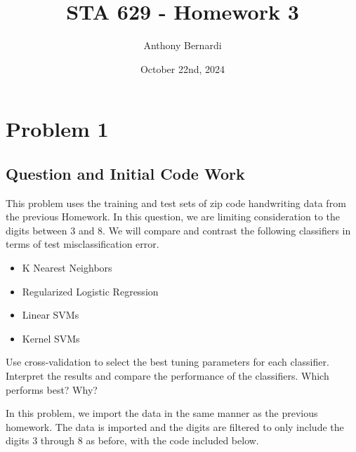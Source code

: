 \documentclass[12pt, letterpaper]{article}
\title{STA 629 - Homework 3}
\author{Anthony Bernardi}
\date{October 22nd, 2024}
\begin{document}
\maketitle

\section{Problem 1}

\subsection{Question and Initial Code Work}

This problem uses the training and test sets of zip code handwriting data from the previous Homework. In this question, we are limiting consideration to the digits between 3 and 8. 
We will compare and contrast the following classifiers in terms of test misclassification error. 

\begin{itemize} 
  \item K Nearest Neighbors 
  \item Regularized Logistic Regression 
  \item Linear SVMs 
  \item Kernel SVMs 
\end{itemize} 

Use cross-validation to select the best tuning parameters for each classifier. Interpret the results and compare the performance of the classifiers. Which performs best? Why? 

In this problem, we import the data in the same manner as the previous homework. The data is imported and the digits are filtered to only include the digits 3 through 8 as before, with the code included below. 
\end{document}

